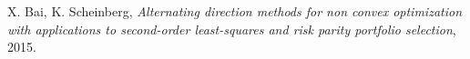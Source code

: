  X. Bai, K. Scheinberg,
  \emph{Alternating direction methods for non convex
  optimization with applications to second-order
  least-squares and risk parity portfolio selection},
  2015.